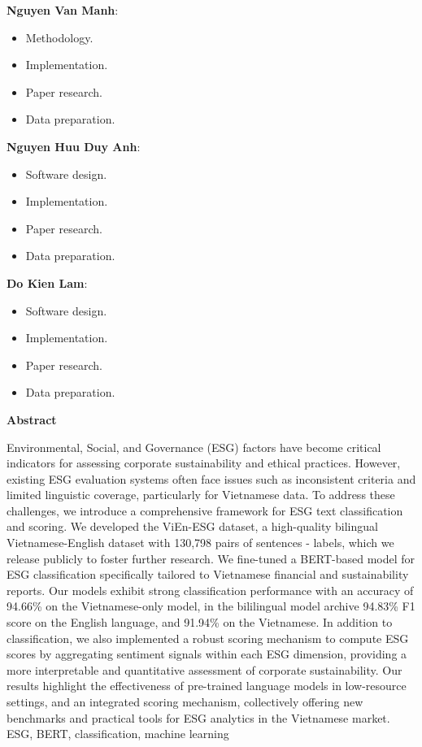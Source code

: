 \documentclass[12pt, letterpaper]{template}
\begin{document}
\textbf{Nguyen Van Manh}:
\begin{itemize}
    \item Methodology.
    \item Implementation.
    \item Paper research.
    \item Data preparation.
\end{itemize}

\textbf{Nguyen Huu Duy Anh}:
\begin{itemize}
    \item Software design.
    \item Implementation.
    \item Paper research.
    \item Data preparation.
\end{itemize}

\textbf{Do Kien Lam}:
\begin{itemize}
    \item Software design.
    \item Implementation.
    \item Paper research.
    \item Data preparation.
\end{itemize}
\clearpage
\textbf{Abstract}

Environmental, Social, and Governance (ESG) factors have become critical indicators for assessing corporate sustainability and ethical practices. However, existing ESG evaluation systems often face issues such as inconsistent criteria and limited linguistic coverage, particularly for Vietnamese data. To address these challenges, we introduce a comprehensive framework for ESG text classification and scoring. We developed the ViEn-ESG dataset, a high-quality bilingual Vietnamese-English dataset with 130,798 pairs of sentences - labels, which we release publicly to foster further research. We fine-tuned a BERT-based model for ESG classification specifically tailored to Vietnamese financial and sustainability reports. Our models exhibit strong classification performance with an accuracy of 94.66\% on the Vietnamese-only model, in the bililingual model archive 94.83\% F1 score on the English language, and 91.94\% on the Vietnamese. In addition to classification, we also implemented a robust scoring mechanism to compute ESG scores by aggregating sentiment signals within each ESG dimension, providing a more interpretable and quantitative assessment of corporate sustainability. Our results highlight the effectiveness of pre-trained language models in low-resource settings, and an integrated scoring mechanism, collectively offering new benchmarks and practical tools for ESG analytics in the Vietnamese market.
ESG, BERT, classification, machine learning
\end{document}
